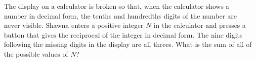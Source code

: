 The display on a calculator is broken so that, when the calculator shows a number in decimal form, the tenths and hundredths digits of the number are never visible. Shawna enters a positive integer $N$ in the calculator and presses a button that gives the reciprocal of the integer in decimal form. The nine digits following the missing digits in the display are all threes. What is the sum of all of the possible values of $N$?
